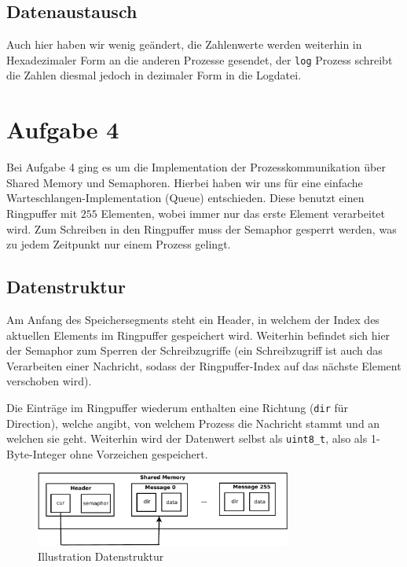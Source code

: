 \documentclass[12pt, a4paper]{scrartcl}
\begin{document}
\subsection{Datenaustausch}
Auch hier haben wir wenig geändert, die Zahlenwerte werden weiterhin in Hexadezimaler Form an die anderen Prozesse gesendet, der \texttt{log} Prozess schreibt die Zahlen diesmal jedoch in dezimaler Form in die Logdatei.

\clearpage
\section{Aufgabe 4}

Bei Aufgabe 4 ging es um die Implementation der Prozesskommunikation über
Shared Memory und Semaphoren. Hierbei haben wir uns für eine einfache
Warteschlangen-Implementation (Queue) entschieden. Diese benutzt einen
Ringpuffer mit $255$ Elementen, wobei immer nur das erste Element verarbeitet
wird. Zum Schreiben in den Ringpuffer muss der Semaphor gesperrt werden, was zu
jedem Zeitpunkt nur einem Prozess gelingt.

\subsection{Datenstruktur}

Am Anfang des Speichersegments steht ein Header, in welchem der Index des
aktuellen Elements im Ringpuffer gespeichert wird. Weiterhin befindet sich hier
der Semaphor zum Sperren der Schreibzugriffe (ein Schreibzugriff ist auch das
Verarbeiten einer Nachricht, sodass der Ringpuffer-Index auf das nächste
Element verschoben wird).
\np

Die Einträge im Ringpuffer wiederum enthalten eine Richtung (\texttt{dir} für
Direction), welche angibt, von welchem Prozess die Nachricht stammt und an
welchen sie geht. Weiterhin wird der Datenwert selbst als \texttt{uint8\_t},
also als 1-Byte-Integer ohne Vorzeichen gespeichert.

\begin{figure}[h!]
\centering
\caption{Illustration Datenstruktur}
\includegraphics[width=0.75\textwidth]{a4-crop}
\end{figure}
\end{document}
